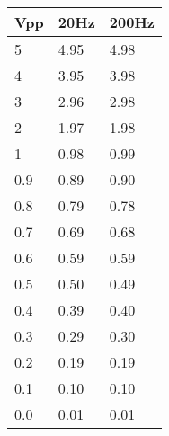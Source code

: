 \begin{longtable}[c]{@{}lll@{}}
\toprule
Vpp & 20Hz & 200Hz\tabularnewline
\midrule
\endhead
5 & 4.95 & 4.98\tabularnewline
4 & 3.95 & 3.98\tabularnewline
3 & 2.96 & 2.98\tabularnewline
2 & 1.97 & 1.98\tabularnewline
1 & 0.98 & 0.99\tabularnewline
0.9 & 0.89 & 0.90\tabularnewline
0.8 & 0.79 & 0.78\tabularnewline
0.7 & 0.69 & 0.68\tabularnewline
0.6 & 0.59 & 0.59\tabularnewline
0.5 & 0.50 & 0.49\tabularnewline
0.4 & 0.39 & 0.40\tabularnewline
0.3 & 0.29 & 0.30\tabularnewline
0.2 & 0.19 & 0.19\tabularnewline
0.1 & 0.10 & 0.10\tabularnewline
0.0 & 0.01 & 0.01\tabularnewline
\bottomrule
\end{longtable}
